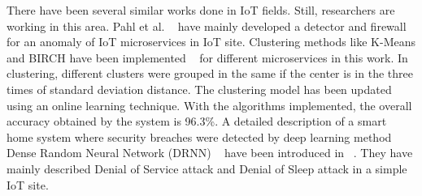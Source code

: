 There have been several similar works done in IoT fields. Still, researchers are working in this area. Pahl et al. ~\cite{PahlA18} have
mainly developed a detector and firewall for an anomaly of IoT microservices in IoT site. 
Clustering methods like K-Means and BIRCH have been implemented ~\cite{AGGARWAL200381} for different microservices in this work. 
In clustering, different clusters were grouped in the same if the center is in the three times of standard deviation distance. 
The clustering model has been updated using an online learning technique. 
With the algorithms implemented, the overall accuracy obtained by the system is 96.3\%. 
A detailed description of a smart home system where security breaches were detected by deep learning method Dense
Random Neural Network (DRNN) ~\cite{BRUN2018458} have been introduced in ~\cite{BRUN2018458}.
They have mainly described Denial of Service attack and Denial of Sleep attack in a simple IoT site. 

